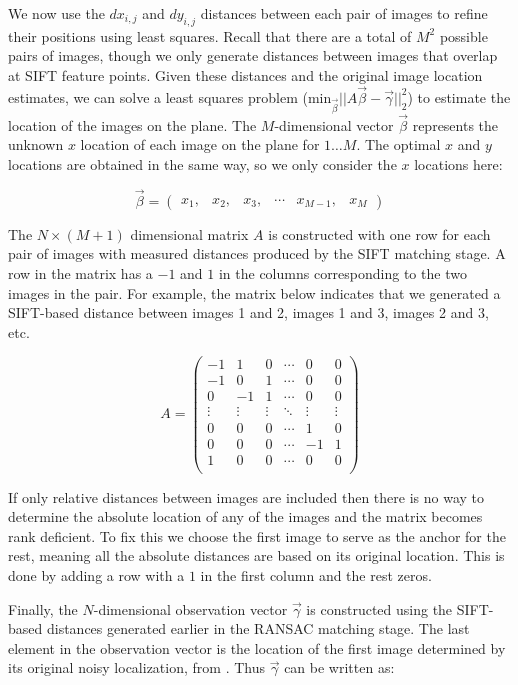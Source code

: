\documentclass[10pt,twocolumn,letterpaper]{article}
\begin{document}
We now use the $dx_{i,j}$ and $dy_{i,j}$ distances between each pair of images to refine their positions using least squares. Recall that there are a total of $M^{2}$ possible pairs of images, though we only
generate distances between images that overlap at SIFT feature
points. Given these distances and the original image location
estimates, we can solve a least squares problem
($\textrm{min}_{\vec{\beta}} ||A \vec{\beta} - \vec{\gamma}||_2^2 $)
to estimate the location of the images on the plane. The
$M$-dimensional vector $\vec{\beta}$ represents the unknown $x$ location of each image on the plane for $1 \dots M$. The optimal
$x$ and $y$ locations are obtained in the same way, so we only
consider the $x$ locations here:

\[\vec{\beta} =
\begin{pmatrix}
  x_1, & x_2, & x_3, & \cdots & x_{M-1}, & x_M
\end{pmatrix}
\]

The $N \times (M+1)$ dimensional matrix $A$ is constructed with one row
for each pair of images with measured distances produced by the SIFT
matching stage. A row in the matrix has a $-1$ and $1$ in the columns
corresponding to the two images in the pair. For example, the matrix
below indicates that we generated a SIFT-based distance between images
1 and 2, images 1 and 3, images 2 and 3, etc.

\[
A =
\begin{pmatrix}
  -1 & 1 & 0 & \cdots & 0 & 0\\
  -1 & 0 & 1 & \cdots & 0 & 0\\
  0 & -1 & 1 & \cdots & 0 & 0\\
  \vdots  & \vdots & \vdots & \ddots & \vdots  & \vdots\\
  0 & 0 & 0 & \cdots & 1 & 0 \\
  0 & 0 & 0 & \cdots & -1 & 1 \\
  1 & 0 & 0 & \cdots & 0 & 0 \\
\end{pmatrix}
\]

If only relative distances between images are included then there is
no way to determine the absolute location of any of the images and the
matrix becomes rank deficient. To fix this we choose the first image
to serve as the anchor for the rest, meaning all the absolute
distances are based on its original location. This is done by adding a
row with a $1$ in the first column and the rest zeros.

Finally, the $N$-dimensional observation vector $\vec{\gamma}$ is
constructed using the SIFT-based distances generated earlier in the
RANSAC matching stage. The last element in the observation vector is
the location of the first image determined by its original noisy
localization, from \cite{chen2010indoor, liu2010indoor}. Thus $\vec{\gamma}$ can be written as:
\end{document}
